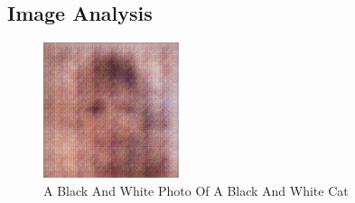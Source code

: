 \documentclass{article}%
\begin{document}
%
\subsection{Image Analysis}%
\label{subsec:ImageAnalysis}%


\begin{figure}[h!]%
\centering%
\includegraphics[width=150px]{500_fake_images/samples_5_44.png}%
\caption{A Black And White Photo Of A Black And White Cat}%
\end{figure}

%
\end{document}
